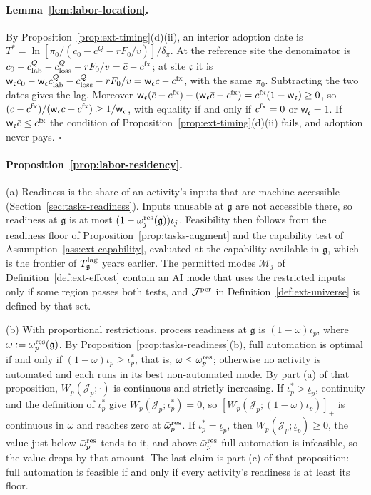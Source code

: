 \paragraph{Lemma~\ref{lem:labor-location}.}
By Proposition~\ref{prop:ext-timing}(d)(ii), an interior adoption date is $T^*=\ln[\pi_0/(c_0-c^Q-rF_0/v)]/\delta_\pi$. At the reference site the denominator is $c_0-c^Q_{\rm lab}-c^Q_{\rm loss}-rF_0/v=\bar c-c^{\rm fx}$; at site $\mathfrak c$ it is $\mathsf w_{\mathfrak c}c_0-\mathsf w_{\mathfrak c}c^Q_{\rm lab}-c^Q_{\rm loss}-rF_0/v=\mathsf w_{\mathfrak c}\bar c-c^{\rm fx}$, with the same $\pi_0$. Subtracting the two dates gives the lag. Moreover $\mathsf w_{\mathfrak c}(\bar c-c^{\rm fx})-(\mathsf w_{\mathfrak c}\bar c-c^{\rm fx})=c^{\rm fx}(1-\mathsf w_{\mathfrak c})\ge0$, so $(\bar c-c^{\rm fx})/(\mathsf w_{\mathfrak c}\bar c-c^{\rm fx})\ge1/\mathsf w_{\mathfrak c}$, with equality if and only if $c^{\rm fx}=0$ or $\mathsf w_{\mathfrak c}=1$. If $\mathsf w_{\mathfrak c}\bar c\le c^{\rm fx}$ the condition of Proposition~\ref{prop:ext-timing}(d)(ii) fails, and adoption never pays. $\square$

\paragraph{Proposition~\ref{prop:labor-residency}.}
(a) Readiness is the share of an activity's inputs that are machine-accessible (Section~\ref{sec:tasks-readiness}). Inputs unusable at $\mathfrak g$ are not accessible there, so readiness at $\mathfrak g$ is at most $(1-\omega^{\rm res}_j(\mathfrak g))\iota_j$. Feasibility then follows from the readiness floor of Proposition~\ref{prop:tasks-augment} and the capability test of Assumption~\ref{ass:ext-capability}, evaluated at the capability available in $\mathfrak g$, which is the frontier of $T^{\rm lag}_{\mathfrak g}$ years earlier. The permitted modes $\mathcal M_j$ of Definition~\ref{def:ext-effcost} contain an AI mode that uses the restricted inputs only if some region passes both tests, and $\mathcal J^{\rm per}$ in Definition~\ref{def:ext-universe} is defined by that set.

(b) With proportional restrictions, process readiness at $\mathfrak g$ is $(1-\omega)\iota_p$, where $\omega:=\omega^{\rm res}_p(\mathfrak g)$. By Proposition~\ref{prop:tasks-readiness}(b), full automation is optimal if and only if $(1-\omega)\iota_p\ge\iota^*_p$, that is, $\omega\le\bar\omega^{\rm res}_p$; otherwise no activity is automated and each runs in its best non-automated mode. By part (a) of that proposition, $W_p(\mathcal J_p;\cdot)$ is continuous and strictly increasing. If $\iota^*_p>\underline\iota_p$, continuity and the definition of $\iota^*_p$ give $W_p(\mathcal J_p;\iota^*_p)=0$, so $[W_p(\mathcal J_p;(1-\omega)\iota_p)]_+$ is continuous in $\omega$ and reaches zero at $\bar\omega^{\rm res}_p$. If $\iota^*_p=\underline\iota_p$, then $W_p(\mathcal J_p;\underline\iota_p)\ge0$, the value just below $\bar\omega^{\rm res}_p$ tends to it, and above $\bar\omega^{\rm res}_p$ full automation is infeasible, so the value drops by that amount. The last claim is part (c) of that proposition: full automation is feasible if and only if every activity's readiness is at least its floor.

